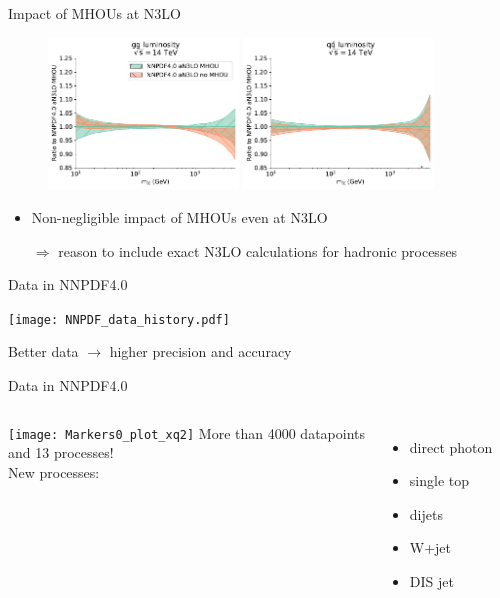 \begin{frame}{Impact of MHOUs at N3LO}
  \begin{figure}[!t]
    \centering
    \includegraphics[width=0.45\textwidth]{figures/gg_plot_lumi1d.pdf}
    \includegraphics[width=0.45\textwidth]{figures/qqbar_plot_lumi1d.pdf}
  \end{figure}
  \begin{itemize}
    \item Non-negligible impact of MHOUs even at N3LO
    \item[$\Rightarrow$] reason to include exact N3LO calculations for hadronic processes
  \end{itemize}
\end{frame}


\begin{frame}[t]{Data in NNPDF4.0}
  \begin{center}
    \texttt{[image: NNPDF\_data\_history.pdf]}
  \end{center}
  Better data $\rightarrow$ higher precision and accuracy
\end{frame}


\begin{frame}[t]{Data in NNPDF4.0}
  \begin{columns}
          \texttt{[image: Markers0\_plot\_xq2]}
          More than 4000 datapoints\\
          and 13 processes!\\
          \vspace*{1em}
          New processes:
          \begin{itemize}
              \item direct photon
              \item single top
              \item dijets
              \item W+jet
              \item DIS jet
          \end{itemize}
  \end{columns}
\end{frame}


